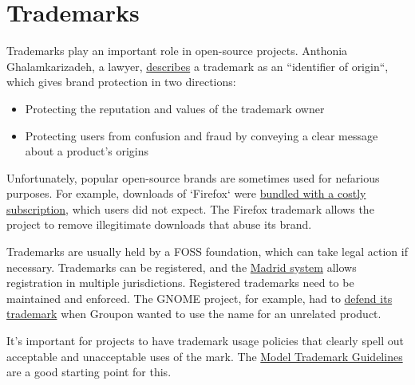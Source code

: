 


\chapter{Trademarks}

Trademarks play an important role in open-source projects.  Anthonia Ghalamkarizadeh, a lawyer, \href{https://lwn.net/Articles/546678/}{describes} a trademark as an ``identifier of origin``, which gives brand protection in two directions:

\begin{itemize}

\itemsep 0.50em

\item Protecting the reputation and values of the trademark owner

\item Protecting users from confusion and fraud by conveying a clear message about a product's origins

\end{itemize}

Unfortunately, popular open-source brands are sometimes used for nefarious purposes.  For example, downloads of `Firefox` were \href{https://lwn.net/Articles/546678/}{bundled with a costly subscription}, which users did not expect.  The Firefox trademark allows the project to remove illegitimate downloads that abuse its brand.

Trademarks are usually held by a FOSS foundation, which can take legal action if necessary.  Trademarks can be registered, and the \href{https://en.wikipedia.org/wiki/Madrid_system}{Madrid system} allows registration in multiple jurisdictions.  Registered trademarks need to be maintained and enforced.  The GNOME project, for example, had to \href{https://lwn.net/Articles/654124/}{defend its trademark} when Groupon wanted to use the name for an unrelated product.

It's important for projects to have trademark usage policies that clearly spell out acceptable and unacceptable uses of the mark.  The \href{http://modeltrademarkguidelines.org/}{Model Trademark Guidelines} are a good starting point for this.

